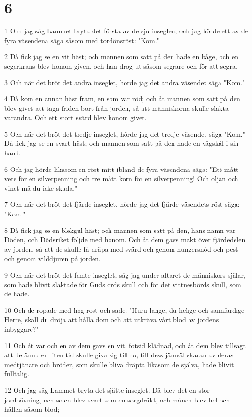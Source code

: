 \chapter{6}

\par 1 Och jag såg Lammet bryta det första av de sju inseglen; och jag hörde ett av de fyra väsendena säga såsom med tordönsröst: "Kom."
\par 2 Då fick jag se en vit häst; och mannen som satt på den hade en båge, och en segerkrans blev honom given, och han drog ut såsom segrare och för att segra.
\par 3 Och när det bröt det andra inseglet, hörde jag det andra väsendet säga "Kom."
\par 4 Då kom en annan häst fram, en som var röd; och åt mannen som satt på den blev givet att taga friden bort från jorden, så att människorna skulle slakta varandra. Och ett stort svärd blev honom givet.
\par 5 Och när det bröt det tredje inseglet, hörde jag det tredje väsendet säga "Kom." Då fick jag se en svart häst; och mannen som satt på den hade en vågskål i sin hand.
\par 6 Och jag hörde likasom en röst mitt ibland de fyra väsendena säga: "Ett mått vete för en silverpenning och tre mått korn för en silverpenning! Och oljan och vinet må du icke skada."
\par 7 Och när det bröt det fjärde inseglet, hörde jag det fjärde väsendets röst säga: "Kom."
\par 8 Då fick jag se en blekgul häst; och mannen som satt på den, hans namn var Döden, och Dödsriket följde med honom. Och åt dem gavs makt över fjärdedelen av jorden, så att de skulle få dräpa med svärd och genom hungersnöd och pest och genom vilddjuren på jorden.
\par 9 Och när det bröt det femte inseglet, såg jag under altaret de människors själar, som hade blivit slaktade för Guds ords skull och för det vittnesbörds skull, som de hade.
\par 10 Och de ropade med hög röst och sade: "Huru länge, du helige och sannfärdige Herre, skall du dröja att hålla dom och att utkräva vårt blod av jordens inbyggare?"
\par 11 Och åt var och en av dem gavs en vit, fotsid klädnad, och åt dem blev tillsagt att de ännu en liten tid skulle giva sig till ro, till dess jämväl skaran av deras medtjänare och bröder, som skulle bliva dräpta likasom de själva, hade blivit fulltalig.
\par 12 Och jag såg Lammet bryta det sjätte inseglet. Då blev det en stor jordbävning, och solen blev svart som en sorgdräkt, och månen blev hel och hållen såsom blod;
